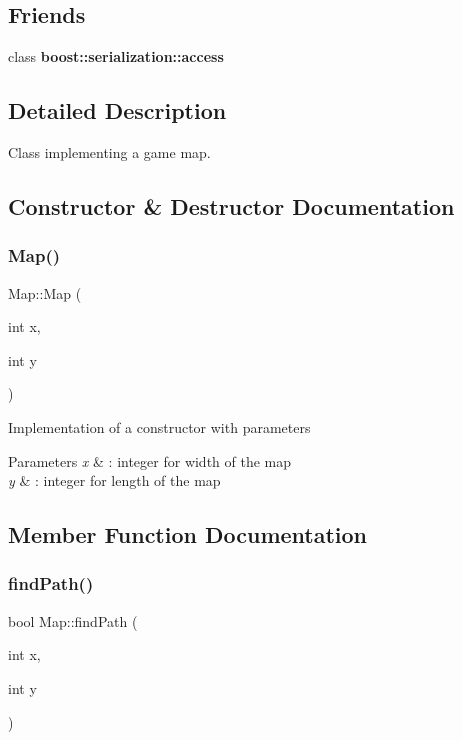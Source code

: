 \subsection*{Friends}
\begin{DoxyCompactItemize}
\item 
\hypertarget{class_map_ac98d07dd8f7b70e16ccb9a01abf56b9c}{}\label{class_map_ac98d07dd8f7b70e16ccb9a01abf56b9c} 
class {\bfseries boost\+::serialization\+::access}
\end{DoxyCompactItemize}


\subsection{Detailed Description}
Class implementing a game map. 

\subsection{Constructor \& Destructor Documentation}
\hypertarget{class_map_a7dd574b3746a45123fd765945b6a2a7e}{}\label{class_map_a7dd574b3746a45123fd765945b6a2a7e} 
\subsubsection{\texorpdfstring{Map()}{Map()}}
{\footnotesize\ttfamily Map\+::\+Map (\begin{DoxyParamCaption}\item[{int}]{x,  }\item[{int}]{y }\end{DoxyParamCaption})}

Implementation of a constructor with parameters 
\begin{DoxyParams}{Parameters}
{\em x} & \+: integer for width of the map \\
\hline
{\em y} & \+: integer for length of the map \\
\hline
\end{DoxyParams}


\subsection{Member Function Documentation}
\hypertarget{class_map_a37b9af3a5474a3a1511bee4d25f64080}{}\label{class_map_a37b9af3a5474a3a1511bee4d25f64080} 
\subsubsection{\texorpdfstring{find\+Path()}{findPath()}}
{\footnotesize\ttfamily bool Map\+::find\+Path (\begin{DoxyParamCaption}\item[{int}]{x,  }\item[{int}]{y }\end{DoxyParamCaption})}

